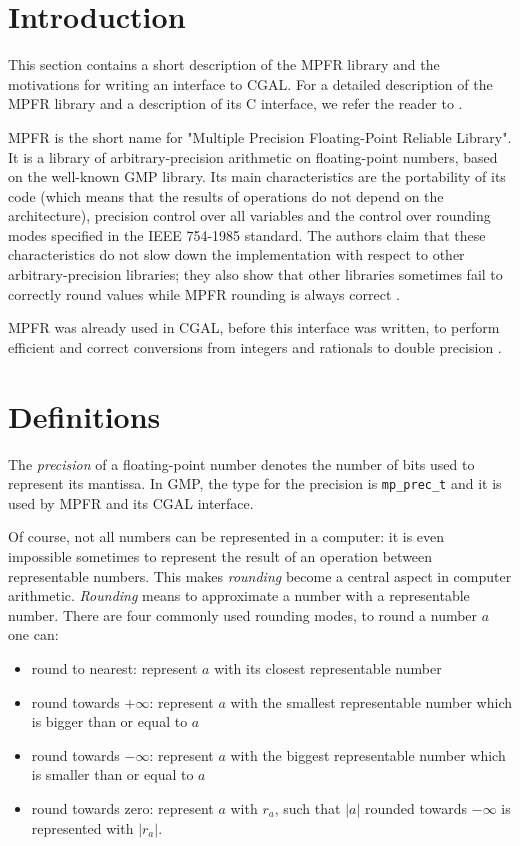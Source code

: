 \section{Introduction}

This section contains a short description of the MPFR library and the
motivations for writing an interface to CGAL.
For a detailed description of the MPFR library and a description of
its C interface, we refer the reader to \cite{mpfr:manual}.

MPFR is the short name for "Multiple Precision Floating-Point
Reliable Library".
It is a library of arbitrary-precision arithmetic on floating-point
numbers, based on the well-known GMP library.
Its main characteristics are the portability of its code (which means that
the results of operations do not depend on the architecture), precision
control over all variables and the control over rounding modes specified
in the IEEE 754-1985 standard.
The authors claim that these characteristics do not slow down the
implementation with respect to other arbitrary-precision libraries;
they also show that other libraries sometimes fail to correctly round
values while MPFR rounding is always correct \cite{mpfr:paper}.

MPFR was already used in CGAL, before this interface was written, to
perform efficient and correct conversions from integers and rationals
to double precision \cite{mpfr:pion}.


\section{Definitions}

The \emph{precision} of a floating-point number denotes the number of 
bits used to represent its mantissa.
In GMP, the type for the precision is \verb=mp_prec_t= and it is used
by MPFR and its CGAL interface.

Of course, not all numbers can be represented in a computer: it is even
impossible sometimes to represent the result of an operation between
representable numbers.
This makes \emph{rounding} become a central aspect in computer arithmetic.
\emph{Rounding} means to approximate a number with a representable
number.
There are four commonly used rounding modes, to round a number \(a\)
one can:
\begin{itemize}
	\item round to nearest: represent \(a\) with its closest
	representable number
	\item round towards \(+ \infty\): represent \(a\) with
	the smallest representable number which is bigger than or
	equal to \(a\)
	\item round towards \(- \infty\): represent \(a\) with
	the biggest representable number which is smaller than or
	equal to \(a\)
	\item round towards zero: represent \(a\) with \(r_a\), such
	that \(|a|\) rounded towards \(- \infty\) is represented with
	\(|r_a|\).
\end{itemize}


